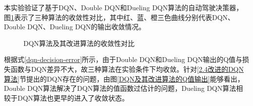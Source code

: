 本实验验证了基于DQN、Double DQN和Dueling DQN算法的自动驾驶决策器，图\ref{DQN算法及其改进算法的收敛性对比}表示了三种算法的收敛性对比，其中红、蓝、橙三色曲线分别代表DQN、Double DQN、Dueling DQN的输出收敛情况。

\begin{figure}[htbp]
    \vspace{13pt}
    \centering
    \caption{DQN算法及其改进算法的收敛性对比}\label{DQN算法及其改进算法的收敛性对比} 
\end{figure}

根据式\ref{dqn-decision-error}所示，由于Double DQN和Dueling DQN输出的Q值与损失函数与DQN差异不大，故三种算法在实验条件下均收敛。针对\ref{2.4改进的DQN算法}节提出的DQN存在的问题，由图\ref{DQN及其改进算法的Q值输出}能够看出，Double DQN算法解决了DQN算法的值函数过估计的问题，Dueling DQN算法相较于DQN算法也更早的进入了收敛状态。

